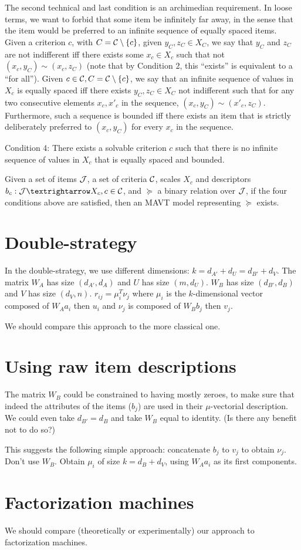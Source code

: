\documentclass[french, english]{da2pl2018}
\begin{document}
The second technical and last condition is an archimedian requirement. In loose terms, we want to forbid that some item be infinitely far away, in the sense that the item would be preferred to an infinite sequence of equally spaced items. Given a criterion $c$, with $C = \mathcal{C} \setminus \{c\}$, given $y_C, z_C \in X_C$, we say that $y_C$ and $z_C$ are not indifferent iff there exists some $x_c \in X_c$ such that not $(x_c, y_C) \sim (x_c, z_C)$ (note that by Condition 2, this “exists” is equivalent to a “for all”). Given $c \in \mathcal{C}, C = \mathcal{C} \setminus \{c\}$, we say that an infinite sequence of values in $X_c$ is equally spaced iff there exists $y_C, z_C \in X_C$ not indifferent such that for any two consecutive elements $x_c, x'_c$ in the sequence, $(x_c, y_C) \sim (x'_c, z_C)$. Furthermore, such a sequence is bounded iff there exists an item that is strictly deliberately preferred to $(x_c, y_C)$ for every $x_c$ in the sequence.

Condition 4: There exists a solvable criterion $c$ such that there is no infinite sequence of values in $X_c$ that is equally spaced and bounded.

\begin{thm}
	Given a set of items $\mathcal{J}$, a set of criteria $\mathcal{C}$, scales $X_c$ and descriptors $b_c: \allitems → X_c, c \in \allcrits$, and $\succeq$ a binary relation over $\mathcal{J}$, if the four conditions above are satisfied, then an \ac{MAVT} model representing $\succeq$ exists.
\end{thm}

\section{Double-strategy}
In the double-strategy, we use different dimensions: $k = d_{A'} + d_U = d_{B'} + d_V$.
The matrix $W_A$ has size $(d_{A'}, d_A)$ and $U$ has size $(m, d_U)$. $W_B$ has size $(d_{B'}, d_B)$ and $V$ has size $(d_V, n)$. $r_{ij} = \mu_i^T \nu_j$ where $\mu_i$ is the $k$-dimensional vector composed of $W_A a_i$ then $u_i$ and $\nu_j$ is composed of $W_B b_j$ then $v_j$.

We should compare this approach to the more classical one.

\section{Using raw item descriptions}
The matrix $W_B$ could be constrained to having mostly zeroes, to make sure that indeed the attributes of the items ($b_j$) are used in their $\mu$-vectorial description. We could even take $d_{B'} = d_B$ and take $W_B$ equal to identity. (Is there any benefit not to do so?)

This suggests the following simple approach: concatenate $b_j$ to $v_j$ to obtain $\nu_j$. Don’t use $W_B$. Obtain $\mu_i$ of size $k = d_B + d_V$, using $W_A a_i$ as its first components.

\section{Factorization machines}
We should compare (theoretically or experimentally) our approach to factorization machines.
\end{document}
